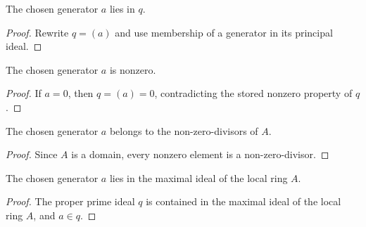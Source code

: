 \begin{lemma}
  \label{lem:bad_quotient_source_data_generator_mem_q}
  The chosen generator \(a\) lies in \(q\).
\end{lemma}

\begin{proof}
  Rewrite \(q=(a)\) and use membership of a generator in its principal ideal.
\end{proof}

\begin{lemma}
  \label{lem:bad_quotient_source_data_generator_ne_zero}
  The chosen generator \(a\) is nonzero.
\end{lemma}

\begin{proof}
  If \(a=0\), then \(q=(a)=0\), contradicting the stored nonzero property of
  \(q\).
\end{proof}

\begin{lemma}
  \label{lem:bad_quotient_source_data_generator_mem_non_zero_divisors}
  The chosen generator \(a\) belongs to the non-zero-divisors of \(A\).
\end{lemma}

\begin{proof}
  Since \(A\) is a domain, every nonzero element is a non-zero-divisor.
\end{proof}

\begin{lemma}
  \label{lem:bad_quotient_source_data_generator_mem_maximal_ideal}
  The chosen generator \(a\) lies in the maximal ideal of the local ring \(A\).
\end{lemma}

\begin{proof}
  The proper prime ideal \(q\) is contained in the maximal ideal of the local
  ring \(A\), and \(a\in q\).
\end{proof}

